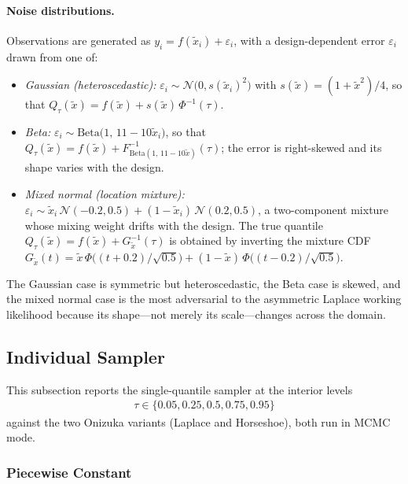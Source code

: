 \paragraph{Noise distributions.} Observations are generated as $y_i = f(\tilde{x}_i) + \varepsilon_i$, with a design-dependent error $\varepsilon_i$ drawn from one of:
\begin{itemize}
\item \emph{Gaussian (heteroscedastic):} $\varepsilon_i \sim \mathcal{N}\!\big(0, s(\tilde{x}_i)^2\big)$ with $s(\tilde{x}) = (1+\tilde{x}^2)/4$, so that $Q_\tau(\tilde{x}) = f(\tilde{x}) + s(\tilde{x})\,\Phi^{-1}(\tau)$.
\item \emph{Beta:} $\varepsilon_i \sim \mathrm{Beta}\big(1,\, 11 - 10\tilde{x}_i\big)$, so that $Q_\tau(\tilde{x}) = f(\tilde{x}) + F^{-1}_{\mathrm{Beta}(1,\,11-10\tilde{x})}(\tau)$; the error is right-skewed and its shape varies with the design.
\item \emph{Mixed normal (location mixture):} $\varepsilon_i \sim \tilde{x}_i\,\mathcal{N}(-0.2, 0.5) + (1-\tilde{x}_i)\,\mathcal{N}(0.2, 0.5)$, a two-component mixture whose mixing weight drifts with the design. The true quantile $Q_\tau(\tilde{x}) = f(\tilde{x}) + G_{\tilde{x}}^{-1}(\tau)$ is obtained by inverting the mixture CDF $G_{\tilde{x}}(t) = \tilde{x}\,\Phi\!\big((t+0.2)/\sqrt{0.5}\big) + (1-\tilde{x})\,\Phi\!\big((t-0.2)/\sqrt{0.5}\big)$.
\end{itemize}
The Gaussian case is symmetric but heteroscedastic, the Beta case is skewed, and the mixed normal case is the most adversarial to the asymmetric Laplace working likelihood because its shape---not merely its scale---changes across the domain.

\subsection{Individual Sampler}
\label{sec:sim:individual}

This subsection reports the single-quantile sampler at the interior levels 
\begin{align*}
	\tau \in \{0.05, 0.25, 0.5, 0.75, 0.95\}
\end{align*}
 against the two Onizuka variants (Laplace and Horseshoe), both run in MCMC mode.

\subsubsection{Piecewise Constant}
\label{sec:sim:ind:pc}

